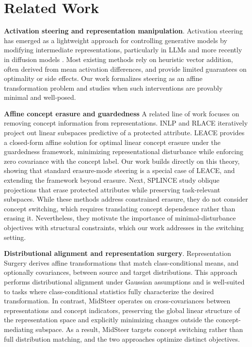 \documentclass{article}
\theoremstyle{plain}
\theoremstyle{definition}
\theoremstyle{remark}
\begin{document}
\vspace{-0.3cm}

\section{Related Work}

\noindent \textbf{Activation steering and representation manipulation}.
Activation steering has emerged as a lightweight approach for controlling generative models by modifying intermediate representations, particularly in LLMs \cite{DBLP:journals/corr/abs-2308-10248} \cite{DBLP:journals/corr/abs-2502-17601} \cite{DBLP:conf/acl/RimskyGSTHT24} and more recently in diffusion models \cite{DBLP:conf/cvpr/TumanyanGBD23} \cite{DBLP:conf/iclr/KwonJU23} \cite{gaintseva2026casteer}. Most existing methods rely on heuristic vector addition, often derived from mean activation differences, and provide limited guarantees on optimality or side effects. Our work formalizes steering as an affine transformation problem and studies when such interventions are provably minimal and well-posed.

\noindent \textbf{Affine concept erasure and guardedness}
A related line of work focuses on removing concept information from representations. INLP \cite{DBLP:conf/acl/RavfogelEGTG20} and RLACE \cite{ravfogel-etal-2023-linear} iteratively project out linear subspaces predictive of a protected attribute. LEACE \cite{belrose2025leace} provides a closed-form affine solution for optimal linear concept erasure under the guardedness framework, minimizing representational disturbance while enforcing zero covariance with the concept label. Our work builds directly on this theory, showing that standard erasure-mode steering is a special case of LEACE, and extending the framework beyond erasure. Next, SPLINCE \cite{DBLP:journals/corr/abs-2506-10703} study oblique projections that erase protected attributes while preserving task-relevant subspaces. While these methods address constrained erasure, they do not consider concept switching, which requires translating concept dependence rather than erasing it. Nevertheless, they motivate the importance of minimal-disturbance objectives with structural constraints, which our work addresses in the switching setting.

\noindent \textbf{Distributional alignment and representation surgery}.
Representation Surgery \cite{DBLP:conf/icml/SinghRHACK24} derives affine transformations that match class-conditional means, and optionally covariances, between source and target distributions. This approach performs distributional alignment under Gaussian assumptions and is well-suited to tasks where class-conditional statistics fully characterize the desired transformation. In contrast, MidSteer operates on cross-covariances between representations and concept indicators, preserving the global linear structure of the representation space and explicitly minimizing changes outside the concept-mediating subspace. As a result, MidSteer targets concept switching rather than full distribution matching, and the two approaches optimize distinct objectives.
\end{document}
